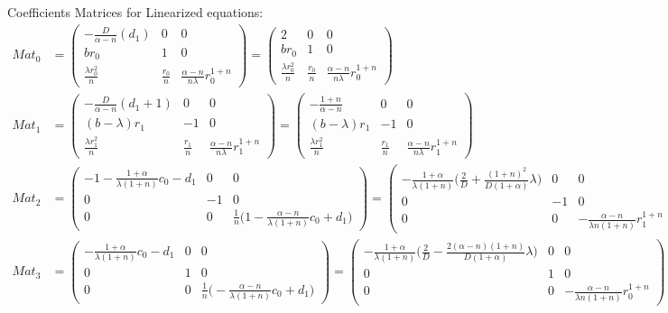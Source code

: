 \documentclass[a4paper,11pt]{article}
\begin{document}
Coefficients Matrices for Linearized equations:
\begin{align*}
 Mat_0 &= \begin{pmatrix}
          -\frac{D}{\alpha-n}(d_1) & 0 & 0\\
          br_0 & 1 & 0\\
          \frac{\lambda r_0^2}{n} & \frac{r_0}{n} & \frac{\alpha-n}{n\lambda}r_0^{1+n}
         \end{pmatrix}
        = \begin{pmatrix}
          2 & 0 & 0\\
          br_0 & 1 & 0\\
          \frac{\lambda r_0^2}{n} & \frac{r_0}{n} & \frac{\alpha-n}{n\lambda}r_0^{1+n}
         \end{pmatrix}\\
 Mat_1 &= \begin{pmatrix}
          -\frac{D}{\alpha-n}(d_1+1) & 0 & 0\\
          (b-\lambda)r_1 & -1 & 0\\
          \frac{\lambda r_1^2}{n} & \frac{r_1}{n} & \frac{\alpha-n}{n\lambda}r_1^{1+n}
         \end{pmatrix}
        =\begin{pmatrix}
          -\frac{1+n}{\alpha-n} & 0 & 0\\
          (b-\lambda)r_1 & -1 & 0\\
          \frac{\lambda r_1^2}{n} & \frac{r_1}{n} & \frac{\alpha-n}{n\lambda}r_1^{1+n}
         \end{pmatrix}\\
 Mat_2 &= \begin{pmatrix}
	  -1-\frac{1+\alpha}{\lambda(1+n)} c_0 -d_1 & 0 & 0\\
	  0 & -1 & 0\\ 
	  0 & 0 & \frac{1}{n}\Big(1-\frac{\alpha-n}{\lambda(1+n)} c_0 +d_1\Big)
         \end{pmatrix}
        = \begin{pmatrix}
	  -\frac{1+\alpha}{\lambda(1+n)} \Big(\frac{2}{D} + \frac{(1+n)^2}{D(1+\alpha)}\lambda\Big) & 0 & 0\\
	  0 & -1 & 0\\ 
	  0 & 0 & -\frac{\alpha-n}{\lambda n(1+n)}r_1^{1+n}
         \end{pmatrix}\\         
 Mat_3 &= \begin{pmatrix}
	  -\frac{1+\alpha}{\lambda(1+n)} c_0 -d_1 & 0 & 0\\
	  0 & 1 & 0\\ 
	  0 & 0 & \frac{1}{n}\Big(-\frac{\alpha-n}{\lambda(1+n)} c_0 +d_1\Big)
         \end{pmatrix}
	=\begin{pmatrix}
	  -\frac{1+\alpha}{\lambda(1+n)} \Big(\frac{2}{D} - \frac{2(\alpha-n)(1+n)}{D(1+\alpha)}\lambda\Big)& 0 & 0\\
	  0 & 1 & 0\\ 
	  0 & 0 & -\frac{\alpha-n}{\lambda n(1+n)}r_0^{1+n}
         \end{pmatrix}         
\end{align*}
\end{document}
